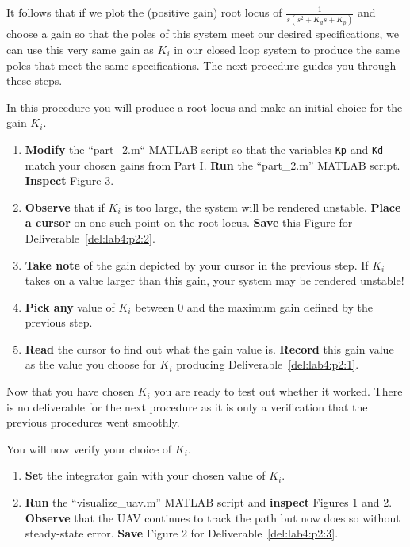 It follows that if we plot the (positive gain) root locus of \(\frac{1}{s(s^2 + K_d s + K_p)}\) and choose a gain so that the poles of this system meet our desired specifications, we can use this very same gain as \(K_i\) in our closed loop system to produce the same poles that meet the same specifications.
The next procedure guides you through these steps.
%
\begin{procedure}[label={proc:lab4:ki}]
  In this procedure you will produce a root locus and make an initial choice for the gain \(K_i.\)
  \begin{enumerate}[label={(\arabic*)}]
    \item{%
      \textbf{Modify} the ``part\_2.m`` MATLAB script so that the variables \texttt{Kp} and \texttt{Kd} match your chosen gains from Part I.
      \textbf{Run} the ``part\_2.m'' MATLAB script.
      \textbf{Inspect} Figure 3.
    }
    \item{%
      \textbf{Observe} that if \(K_i\) is too large, the system will be rendered unstable. \textbf{Place a cursor} on one such point on the root locus.
      \textbf{Save} this Figure for Deliverable~\ref{del:lab4:p2:2}.
    }
    \item{%
      \textbf{Take note} of the gain depicted by your cursor in the previous step.
      If \(K_i\) takes on a value larger than this gain, your system may be rendered unstable!
    }
    \item{%
      \textbf{Pick any} value of \(K_i\) between \(0\) and the maximum gain defined by the previous step.
    }
    \item{%
      \textbf{Read} the cursor to find out what the gain value is.
      \textbf{Record} this gain value as the value you choose for \(K_i\) producing Deliverable~\ref{del:lab4:p2:1}.
    }
  \end{enumerate}
\end{procedure}
%
Now that you have chosen \(K_i\) you are ready to test out whether it worked.
There is no deliverable for the next procedure as it is only a verification that the previous procedures went smoothly.
%
\begin{procedure}[label={proc:lab4:verify}]
  You will now verify your choice of \(K_i.\)
  \begin{enumerate}[label={(\arabic*)}]
    \item{%
      \textbf{Set} the integrator gain with your chosen value of \(K_i.\)
    }
    \item{%
      \textbf{Run} the ``visualize\_uav.m'' MATLAB script and \textbf{inspect} Figures 1 and 2.
      \textbf{Observe} that the UAV continues to track the path but now does so without steady-state error.
      \textbf{Save} Figure 2 for Deliverable~\ref{del:lab4:p2:3}.
    }
  \end{enumerate}
\end{procedure}

